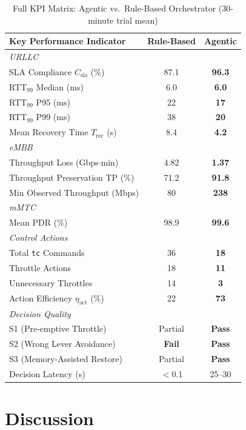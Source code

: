 \begin{table}[H]
\centering
\caption{Full KPI Matrix: Agentic vs.\ Rule-Based Orchestrator (30-minute trial mean)}
\label{tab:kpi_full}
\begin{tabularx}{\textwidth}{Xcc}
\toprule
\textbf{Key Performance Indicator} & \textbf{Rule-Based} & \textbf{Agentic} \\
\midrule
\multicolumn{3}{l}{\textit{URLLC}} \\
SLA Compliance $C_{\text{sla}}$ (\%) & 87.1 & \textbf{96.3} \\
RTT$_{99}$ Median (ms) & 6.0 & \textbf{6.0} \\
RTT$_{99}$ P95 (ms) & 22 & \textbf{17} \\
RTT$_{99}$ P99 (ms) & 38 & \textbf{20} \\
Mean Recovery Time $T_{\text{rec}}$ (s) & 8.4 & \textbf{4.2} \\
\midrule
\multicolumn{3}{l}{\textit{eMBB}} \\
Throughput Loss (Gbps$\cdot$min) & 4.82 & \textbf{1.37} \\
Throughput Preservation TP (\%) & 71.2 & \textbf{91.8} \\
Min Observed Throughput (Mbps) & 80 & \textbf{238} \\
\midrule
\multicolumn{3}{l}{\textit{mMTC}} \\
Mean PDR (\%) & 98.9 & \textbf{99.6} \\
\midrule
\multicolumn{3}{l}{\textit{Control Actions}} \\
Total \texttt{tc} Commands & 36 & \textbf{18} \\
Throttle Actions & 18 & \textbf{11} \\
Unnecessary Throttles & 14 & \textbf{3} \\
Action Efficiency $\eta_{\text{act}}$ (\%) & 22 & \textbf{73} \\
\midrule
\multicolumn{3}{l}{\textit{Decision Quality}} \\
S1 (Pre-emptive Throttle) & Partial & \textbf{Pass} \\
S2 (Wrong Lever Avoidance) & \textbf{Fail} & \textbf{Pass} \\
S3 (Memory-Assisted Restore) & Partial & \textbf{Pass} \\
Decision Latency (s) & $<$0.1 & 25--30 \\
\bottomrule
\end{tabularx}
\end{table}

\section{Discussion}

